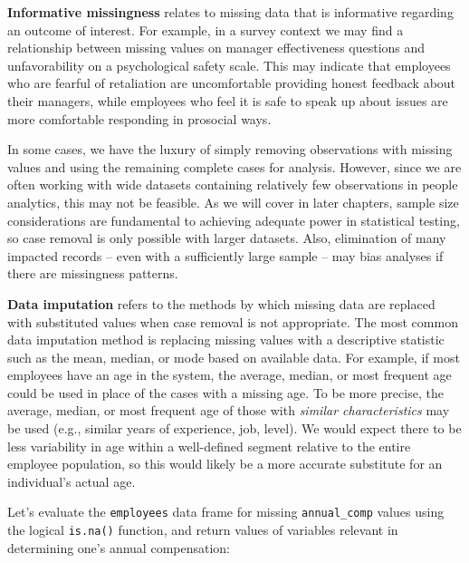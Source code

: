\documentclass[]{book}
\begin{document}
\textbf{Informative missingness} relates to missing data that is informative regarding an outcome of interest. For example, in a survey context we may find a relationship between missing values on manager effectiveness questions and unfavorability on a psychological safety scale. This may indicate that employees who are fearful of retaliation are uncomfortable providing honest feedback about their managers, while employees who feel it is safe to speak up about issues are more comfortable responding in prosocial ways.

In some cases, we have the luxury of simply removing observations with missing values and using the remaining complete cases for analysis. However, since we are often working with wide datasets containing relatively few observations in people analytics, this may not be feasible. As we will cover in later chapters, sample size considerations are fundamental to achieving adequate power in statistical testing, so case removal is only possible with larger datasets. Also, elimination of many impacted records -- even with a sufficiently large sample -- may bias analyses if there are missingness patterns.

\textbf{Data imputation} refers to the methods by which missing data are replaced with substituted values when case removal is not appropriate. The most common data imputation method is replacing missing values with a descriptive statistic such as the mean, median, or mode based on available data. For example, if most employees have an age in the system, the average, median, or most frequent age could be used in place of the cases with a missing age. To be more precise, the average, median, or most frequent age of those with \emph{similar characteristics} may be used (e.g., similar years of experience, job, level). We would expect there to be less variability in age within a well-defined segment relative to the entire employee population, so this would likely be a more accurate substitute for an individual's actual age.

Let's evaluate the \texttt{employees} data frame for missing \texttt{annual\_comp} values using the logical \texttt{is.na()} function, and return values of variables relevant in determining one's annual compensation:
\end{document}
